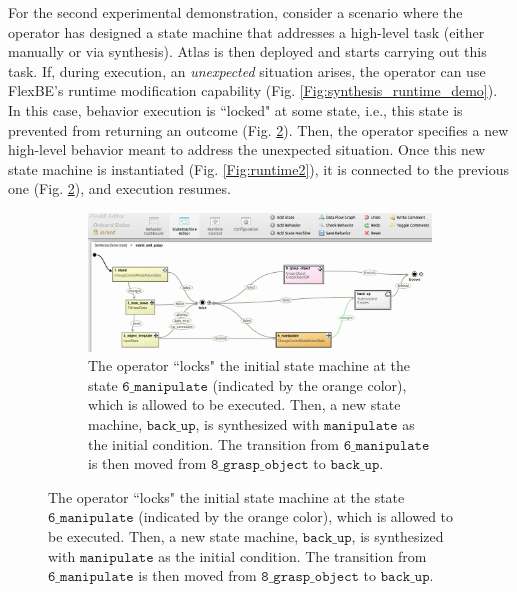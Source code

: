 For the second experimental demonstration, consider a scenario where the operator has designed a state machine that addresses a high-level task (either manually or via synthesis).
Atlas is then deployed and starts carrying out this task.
If, during execution, an \emph{unexpected} situation arises, the operator can use FlexBE's runtime modification capability \cite{Philipp2015MSc} (Fig. \ref{Fig:synthesis_runtime_demo}).
In this case, behavior execution is ``locked" at some state, i.e., this state is prevented from returning an outcome (Fig. \ref{Fig:runtime1}). 
Then, the operator specifies a new high-level behavior meant to address the unexpected situation.
Once this new state machine is instantiated (Fig. \ref{Fig:runtime2}), it is connected to the previous one (Fig. \ref{Fig:runtime1}), and execution resumes.

\begin{figure}[t]
	\centering
	\begin{subfigure}[b]{0.99\columnwidth}
	\includegraphics[width=0.99\columnwidth, clip]{./img/synthesis_runtime_connect_sm.png}
	\caption{The operator ``locks" the initial state machine at the state $\mathtt{6\_manipulate}$ (indicated by the orange color), which is allowed to be executed.
	Then, a new state machine, $\mathtt{back\_up}$, is synthesized with $\mathtt{manipulate}$ as the initial condition.
	The transition from $\mathtt{6\_manipulate}$ is then moved from $\mathtt{8\_grasp\_object}$ to $\mathtt{back\_up}$.
	} 
	\label{Fig:runtime1}
	\end{subfigure}
	

\end{figure}
